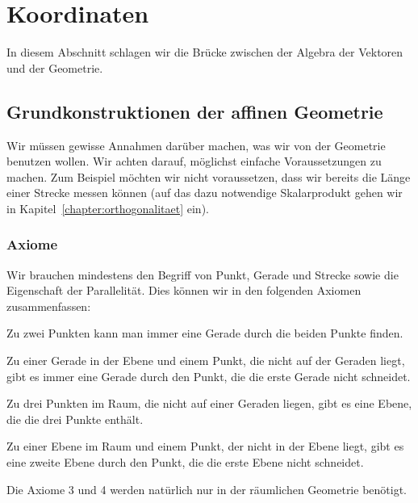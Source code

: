 %
%
%
\section{Koordinaten%
\label{section:koordinaten}}
In diesem Abschnitt schlagen wir die Brücke zwischen der Algebra der
Vektoren und der Geometrie.

\subsection{Grundkonstruktionen der affinen Geometrie}
Wir müssen gewisse Annahmen darüber machen, was
wir von der Geometrie benutzen wollen.
Wir achten darauf, möglichst einfache Voraussetzungen zu machen.
Zum Beispiel möchten wir nicht voraussetzen, dass wir bereits
die Länge einer Strecke messen können (auf das dazu notwendige
Skalarprodukt gehen wir in Kapitel~\ref{chapter:orthogonalitaet} ein).

\subsubsection{Axiome}
Wir brauchen mindestens den Begriff von Punkt, Gerade und Strecke
sowie die Eigenschaft der Parallelität.
Dies können wir in den folgenden Axiomen zusammenfassen:
\begin{compactenum}
\item
Zu zwei Punkten kann man immer eine Gerade durch die beiden Punkte
finden.
\item
Zu einer Gerade in der Ebene und einem Punkt, die nicht auf der Geraden
liegt, gibt es immer eine Gerade durch den Punkt, die die erste Gerade nicht
schneidet.
\item
Zu drei Punkten im Raum, die nicht auf einer Geraden liegen, gibt es
eine Ebene, die die drei Punkte enthält.
\item
Zu einer Ebene im Raum und einem Punkt, der nicht in der Ebene liegt,
gibt es eine zweite Ebene durch den Punkt, die die erste Ebene nicht
schneidet.
\end{compactenum}
Die Axiome 3 und 4 werden natürlich nur in der räumlichen Geometrie
benötigt.

